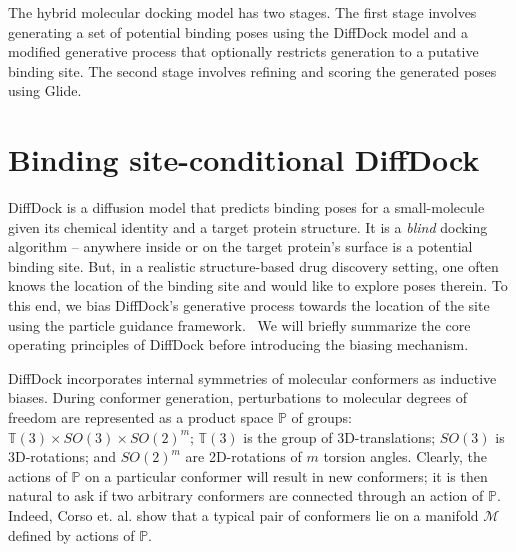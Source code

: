 The hybrid molecular docking model has two stages. The first stage involves generating a set of potential binding poses using the DiffDock model and a modified generative process that optionally restricts generation to a putative binding site. The second stage involves refining and scoring the generated poses using Glide. 

\section{Binding site-conditional DiffDock}

DiffDock is a diffusion model that predicts binding poses for a small-molecule given its chemical identity and a target protein structure. It is a {\it blind} docking algorithm -- anywhere inside or on the target protein's surface is a potential binding site. But, in a realistic structure-based drug discovery setting, one often knows the location of the binding site and would like to explore poses therein. To this end, we bias DiffDock's generative process towards the location of the site using the particle guidance framework.~\cite{corso2023particle} We will briefly summarize the core operating principles of DiffDock before introducing the biasing mechanism.


DiffDock incorporates internal symmetries of molecular conformers as inductive biases. During conformer generation, perturbations to molecular degrees of freedom are represented as a product space $\mathbb{P}$ of groups: $\mathbb{T}(3) \times SO(3) \times SO(2)^m$; $\mathbb{T}(3)$ is the group of 3D-translations; $SO(3)$ is 3D-rotations; and $SO(2)^m$ are 2D-rotations of $m$ torsion angles. Clearly, the actions of $\mathbb{P}$ on a particular conformer will result in new conformers; it is then natural to ask if two arbitrary conformers are connected through an action of $\mathbb{P}$. Indeed, Corso et. al. show that a typical pair of conformers lie on a manifold $\mathcal{M}$ defined by actions of $\mathbb{P}$.~\cite{diffdock}

